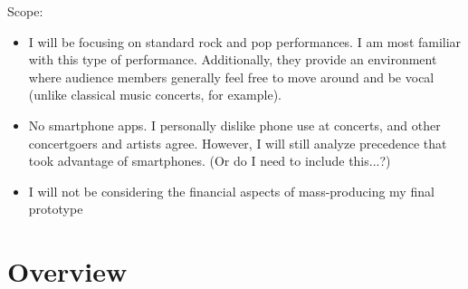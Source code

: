 Scope:
\begin{itemize}
	\item I will be focusing on standard rock and pop performances. I am most familiar with this type of performance. Additionally, they provide an environment where audience members generally feel free to move around and be vocal (unlike classical music concerts, for example).
	\item No smartphone apps. I personally dislike phone use at concerts, and other concertgoers and artists agree. However, I will still analyze precedence that took advantage of smartphones. (Or do I need to include this...?)
	\item I will not be considering the financial aspects of mass-producing my final prototype
\end{itemize}


\section{Overview}


